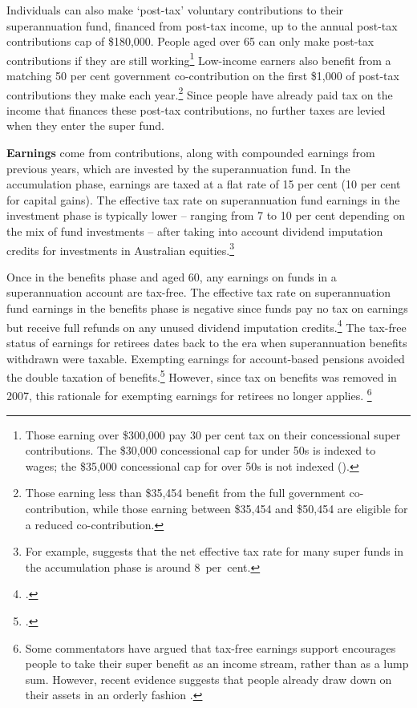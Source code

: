 Individuals can also make ‘post-tax’ voluntary contributions to their superannuation fund, financed from post-tax income, up to the annual post-tax contributions cap of \$180,000.  People aged over 65 can only make post-tax contributions if they are still working\footnote{Those earning over \$300,000 pay 30 per cent tax on their concessional super contributions. The \$30,000 concessional cap for under 50s is indexed to wages; the \$35,000 concessional cap for over 50s is not indexed (\textcite{ATO2015ConcessionalContrCap}).}  Low-income earners also benefit from a matching 50 per cent government co-contribution on the first \$1,000 of post-tax contributions they make each year.\footnote{\textcites{ATO2015SuperCoContr}{ATO2015IncomeThresholdTest} Those earning less than \$35,454 benefit from the full government co-contribution, while those earning between \$35,454 and \$50,454 are eligible for a reduced co-contribution.} Since people have already paid tax on the income that finances these post-tax contributions, no further taxes are levied when they enter the super fund.

\textbf{Earnings} come from contributions, along with compounded earnings from previous years, which are invested by the superannuation fund. In the accumulation phase, earnings are taxed at a flat rate of 15 per cent (10 per cent for capital gains). The effective tax rate on superannuation fund earnings in the investment phase is typically lower – ranging from 7 to 10 per cent depending on the mix of fund investments – after taking into account dividend imputation credits for investments in Australian equities.\footnote{For example, \textcite[][39]{Mercer2015GlobalPensionIndex}  suggests that the net effective tax rate for many super funds in the accumulation phase is around 8~per~cent.}

Once in the benefits phase and aged 60, any earnings on funds in a superannuation account are tax-free. The effective tax rate on superannuation fund earnings in the benefits phase is negative since funds pay no tax on earnings but receive full refunds on any unused dividend imputation credits.\footcites{ATO2015RefundingImputationCredits}[][Appendix~B]{FinancialSystemsInquiry2015} The tax-free status of earnings for retirees dates back to the era when superannuation benefits withdrawn were taxable. Exempting earnings for account-based pensions avoided the double taxation of benefits.\footcite{HenryTaxReview2010} However, since tax on benefits was removed in 2007, this rationale for exempting earnings for retirees no longer applies.%
\footnote{Some commentators have argued that tax-free earnings support encourages people to take their super benefit as an income stream, rather than as a lump sum. However, recent evidence suggests that people already draw down on their assets in an orderly fashion \textcite[][16]{ProductivityCommission2015SuperPolicyPostRetirement}.} 

